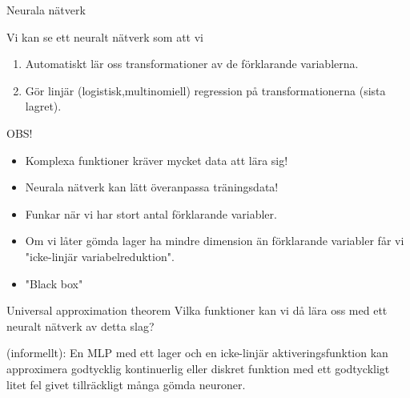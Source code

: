 \documentclass[10pt,english]{beamer}
\begin{document}
\begin{frame}{Neurala nätverk}

    Vi kan se ett neuralt nätverk som att vi
    \begin{enumerate}
        \item Automatiskt lär oss transformationer av de förklarande variablerna.
        \item Gör linjär (logistisk,multinomiell) regression på transformationerna (sista lagret).
    \end{enumerate}
    OBS!
    \begin{itemize}
        \item Komplexa funktioner kräver mycket data att lära sig!
        \item Neurala nätverk kan lätt överanpassa träningsdata!
        \item Funkar när vi har stort antal förklarande variabler.
        \item Om vi låter gömda lager ha mindre dimension än förklarande variabler får vi "icke-linjär variabelreduktion".
        \item "Black box"
    \end{itemize}
    
\end{frame}

\begin{frame}{Universal approximation theorem}
    Vilka funktioner kan vi då lära oss med ett neuralt nätverk av detta slag?

    \begin{greenbox}
         (informellt): En MLP med ett lager och en icke-linjär aktiveringsfunktion kan approximera godtycklig kontinuerlig eller diskret funktion med ett godtyckligt litet fel givet tillräckligt många gömda neuroner.
    \end{greenbox}
\end{frame}
\end{document}
